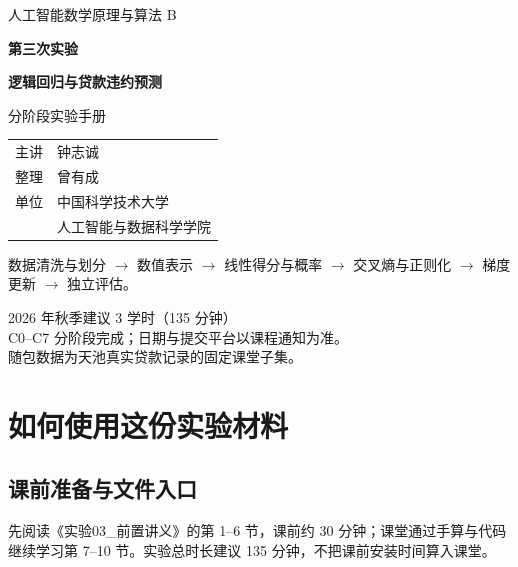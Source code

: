 \documentclass[UTF8,a4paper,11pt,fontset=fandol]{ctexart}
\begin{document}
\hypersetup{pageanchor=false}
\begin{titlepage}
\thispagestyle{empty}
\vspace*{1.4cm}
{\Large\color{Navy}人工智能数学原理与算法 B\par}
\vspace{1.0cm}
{\huge\bfseries\color{Ink}第三次实验\par}
\vspace{.4cm}
{\LARGE\bfseries\color{Navy}逻辑回归与贷款违约预测\par}
\vspace{.8cm}
{\Large 分阶段实验手册\par}
\vspace{1.1cm}
\begin{tabular}{@{}ll}
主讲 & 钟志诚\\[.5em]
整理 & 曾有成\\[.5em]
单位 & 中国科学技术大学\\
 & 人工智能与数据科学学院
\end{tabular}
\vspace{1cm}
\begin{keybox}[从数据到可解释的分类流程]
数据清洗与划分 $\rightarrow$ 数值表示 $\rightarrow$ 线性得分与概率
$\rightarrow$ 交叉熵与正则化 $\rightarrow$ 梯度更新 $\rightarrow$ 独立评估。
\end{keybox}
\vfill
2026 年秋季\quad 建议 3 学时（135 分钟）\\
C0--C7 分阶段完成；日期与提交平台以课程通知为准。\\
随包数据为天池真实贷款记录的固定课堂子集。
\end{titlepage}
\hypersetup{pageanchor=true}
\tableofcontents\clearpage{}
\section{如何使用这份实验材料}
\subsection{课前准备与文件入口}
先阅读《实验03\_前置讲义》的第 1--6 节，课前约 30 分钟；课堂通过手算与代码继续学习第 7--10 节。实验总时长建议 135 分钟，不把课前安装时间算入课堂。
\end{document}
